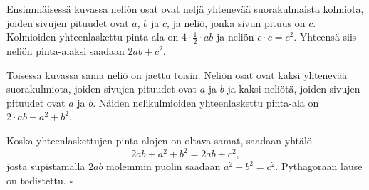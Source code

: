 Ensimmäisessä kuvassa neliön osat ovat neljä yhtenevää suorakulmaista kolmiota, joiden
sivujen pituudet ovat $a$, $b$ ja $c$, ja neliö, jonka sivun pituus on $c$. Kolmioiden yhteenlaskettu pinta-ala 
on $4 \cdot \frac{1}{2} \cdot ab $ ja neliön $c\cdot c = c^2$. Yhteensä siis neliön pinta-alaksi saadaan $2ab + c^2$.

Toisessa kuvassa sama neliö on jaettu toisin. Neliön osat ovat kaksi yhtenevää suorakulmiota, joiden
sivujen pituudet ovat $a$ ja $b$ ja kaksi neliötä, joiden sivujen pituudet ovat $a$ ja $b$.
Näiden nelikulmioiden %
yhteenlaskettu pinta-ala on $2\cdot ab + a^2 + b^2$.

Koska yhteenlaskettujen pinta-alojen on oltava samat, saadaan yhtälö
 \[ 2ab + a^2 + b^2 = 2ab + c^2, \]
josta supistamalla $ 2ab $ molemmin puolin saadaan $a^2 + b^2 = c^2$.
Pythagoraan lause on todistettu. $\square $
